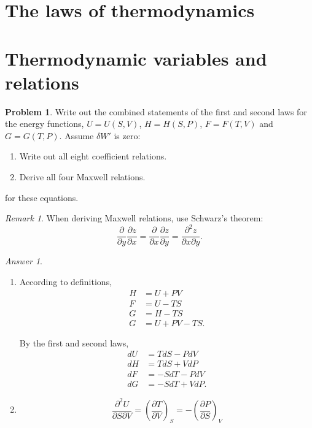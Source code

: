 \documentclass[a4paper, 12pt]{article}
\theoremstyle{definition}
\newtheorem{problem}{Problem}[section]
\theoremstyle{remark}
\newtheorem*{remark}{Remark}
\newtheorem*{answer}{Answer}
\begin{document}
\section{The laws of thermodynamics}

\section{Thermodynamic variables and relations}
\begin{problem}
    Write out the combined statements of the first and second laws for the
    energy functions, $U = U(S, V)$, $H = H(S, P)$, $F = F(T, V)$ and $G = G(T,
    P)$.  Assume $\delta W'$ is zero:
    \begin{enumerate}
        \item Write out all eight coefficient relations.
        \item Derive all four Maxwell relations.
    \end{enumerate}
    for these equations.

    \begin{remark}
        When deriving Maxwell relations, use Schwarz's theorem:
        \[ \frac\partial{\partial y} \frac{\partial z}{\partial x}
            = \frac\partial{\partial x} \frac{\partial z}{\partial y}
            = \frac{\partial^2 z}{\partial x \partial y}.\]
    \end{remark}

    \begin{answer}
        \begin{enumerate}
            \item According to definitions,
                \begin{align*}
                    H &= U + PV \\
                    F &= U - TS \\
                    G &= H - TS \\
                    G &= U + PV - TS. \tag{?}
                \end{align*}

                By the first and second laws,
                \begin{align*}
                    dU &= TdS - PdV \\
                    dH &= TdS + VdP \\
                    dF &= -SdT - PdV \\
                    dG &= -SdT + VdP.
                \end{align*}

            \item
                \[
                    \frac{\partial^2 U}{\partial S \partial V}
                    = \left( \frac{\partial T}{\partial V} \right)_S
                    = -\left( \frac{\partial P}{\partial S} \right)_V
                \]
        \end{enumerate}
    \end{answer}
\end{problem}
\end{document}
